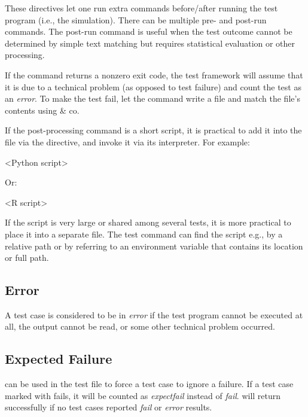 These directives let one run extra commands before/after running the test
program (i.e., the simulation). There can be multiple pre- and post-run
commands. The post-run command is useful when the test outcome cannot be determined
by simple text matching but requires statistical evaluation or other processing.

If the command returns a nonzero exit code, the test framework will assume that
it is due to a technical problem (as opposed to test failure) and count the
test as an \textit{error}. To make the test fail, let the command write a
file and match the file's contents using  \& co.

If the post-processing command is a short script, it is practical
to add it into the  file via the  directive,
and invoke it via its interpreter. For example:

\begin{filelisting}
<Python script>
\end{filelisting}

Or:

\begin{filelisting}
<R script>
\end{filelisting}

If the script is very large or shared among several tests, it is more practical
to place it into a separate file. The test command can find the script e.g.,
by a relative path or by referring to an environment variable that contains
its location or full path.


\subsection{Error}
\label{sec:testing:opptest:error}

A test case is considered to be in \textit{error} if the test program cannot be executed
at all, the output cannot be read, or some other technical problem occurred.

\subsection{Expected Failure}
\label{sec:testing:opptest:expected-failure}

 can be used in the test file to force a test case
to ignore a failure. If a test case marked with  fails,
it will be counted as \textit{expectfail} instead of \textit{fail}.
 will return successfully if no test cases reported \textit{fail}
or \textit{error} results.

